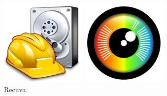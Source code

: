 \documentclass[12pt,oneside,slovak,a4paper]{article}
\begin{document}
\begin{figure}[H]
	\centering
	\begin{minipage}{.15\textwidth}
		\centering
        \includegraphics[width=\linewidth]{./images/tools-avatars/recuva.png}
		\captionsetup{justification=centering}
        \caption{Recuva}
    \end{minipage}\hfill
	\centering
	\begin{minipage}{.15\textwidth}
		\centering
        \includegraphics[width=\linewidth]{./images/tools-avatars/photo_rec.png}

\end{minipage}
\end{figure}
\end{document}
